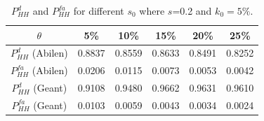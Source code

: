 \begin{table}
	\centering
		\begin{tabular}{| c | c | c | c | c | c |}
		\hline
       $\theta$             &  5\%  &  10\%  &  15\%  & 20\%  & 25\% \\ \hline
      $P^{d}_{HH}$ (Abilen)  & 0.8837 & 0.8559 & 0.8633 & 0.8491 & 0.8252        \\ \hline
      $P^{fa}_{HH}$ (Abilen) & 0.0206 & 0.0115 & 0.0073 & 0.0053 & 0.0042       \\ \hline
      $P^{d}_{HH}$ (Geant)   & 0.9108 & 0.9480 & 0.9662 & 0.9631 & 0.9610        \\ \hline
      $P^{fa}_{HH}$ (Geant)  & 0.0103 & 0.0059 & 0.0043 & 0.0034 & 0.0024        \\ \hline
    \end{tabular}
		\vspace{0.15cm}
	\caption{{$P^{d}_{HH}$ and $P^{fa}_{HH}$ for different $s_{0}$ where $s$=0.2 and $k_{0}=5\%$.}}
	\label{tab:PdPfaDGA}
\end{table}

